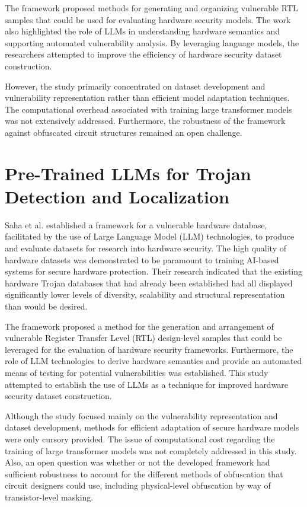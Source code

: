 \documentclass[12pt,a4paper]{report}
\begin{document}
The framework proposed methods for generating and organizing vulnerable RTL samples that could be used for evaluating hardware security models. The work also highlighted the role of LLMs in understanding hardware semantics and supporting automated vulnerability analysis. By leveraging language models, the researchers attempted to improve the efficiency of hardware security dataset construction.

However, the study primarily concentrated on dataset development and vulnerability representation rather than efficient model adaptation techniques. The computational overhead associated with training large transformer models was not extensively addressed. Furthermore, the robustness of the framework against obfuscated circuit structures remained an open challenge.

\section{Pre-Trained LLMs for Trojan Detection and Localization}

Saha et al. established a framework for a vulnerable hardware database, facilitated by the use of Large Language Model (LLM) technologies, to produce and evaluate datasets for research into hardware security. The high quality of hardware datasets was demonstrated to be paramount to training AI-based systems for secure hardware protection. Their research indicated that the existing hardware Trojan databases that had already been established had all displayed significantly lower levels of diversity, scalability and structural representation than would be desired. 

The framework proposed a method for the generation and arrangement of vulnerable Register Transfer Level (RTL) design-level samples that could be leveraged for the evaluation of hardware security frameworks. Furthermore, the role of LLM technologies to derive hardware semantics and provide an automated means of testing for potential vulnerabilities was established. This study attempted to establish the use of LLMs as a technique for improved hardware security dataset construction. 

Although the study focused mainly on the vulnerability representation and dataset development, methods for efficient adaptation of secure hardware models were only cursory provided. The issue of computational cost regarding the training of large transformer models was not completely addressed in this study. Also, an open question was whether or not the developed framework had sufficient robustness to account for the different methods of obfuscation that circuit designers could use, including physical-level obfuscation by way of transistor-level masking.
\end{document}
